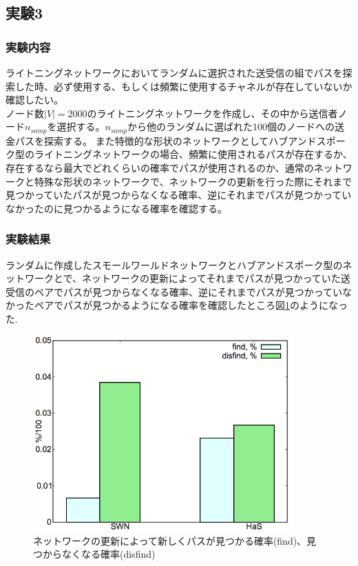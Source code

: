 \documentclass[12pt]{jarticle}
\begin{document}
\subsection{実験3}
\subsubsection{実験内容}
ライトニングネットワークにおいてランダムに選択された送受信の組でパスを探索した時、必ず使用する、もしくは頻繁に使用するチャネルが存在していないか確認したい。\\
ノード数$|V|=2000$のライトニングネットワークを作成し、その中から送信者ノード$n_{samp}$を選択する。$n_{samp}$から他のランダムに選ばれた100個のノードへの送金パスを探索する。%
また特徴的な形状のネットワークとしてハブアンドスポーク型のライトニングネットワークの場合、頻繁に使用されるパスが存在するか、存在するなら最大でどれくらいの確率でパスが使用されるのか、通常のネットワークと特殊な形状のネットワークで、ネットワークの更新を行った際にそれまで見つかっていたパスが見つからなくなる確率、逆にそれまでパスが見つかっていなかったのに見つかるようになる確率を確認する。

\subsubsection{実験結果}
ランダムに作成したスモールワールドネットワークとハブアンドスポーク型のネットワークとで、ネットワークの更新によってそれまでパスが見つかっていた送受信のペアでパスが見つからなくなる確率、逆にそれまでパスが見つかっていなかったペアでパスが見つかるようになる確率を確認したところ図\ref{finddisfind}のようになった.

\begin{figure}[h]
 \centering
   \includegraphics[width=100mm]{figures/finddisfind.png}
 \caption{ネットワークの更新によって新しくパスが見つかる確率(find)、見つからなくなる確率(disfind)}
 \label{finddisfind}
\end{figure}
\end{document}
